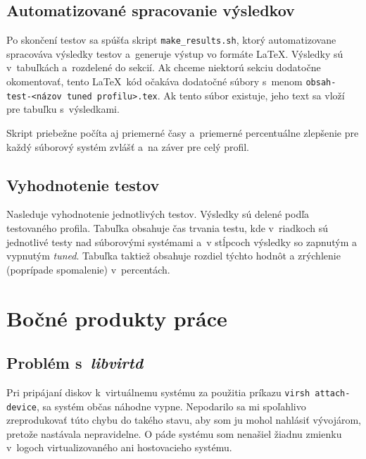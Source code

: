 \section{Automatizované spracovanie výsledkov}

Po skončení testov sa spúšťa skript \texttt{make\_results.sh}, ktorý
automatizovane spracováva výsledky testov a~generuje výstup vo formáte \LaTeX.
Výsledky sú v~tabuľkách a~rozdelené do sekcií. Ak chceme niektorú sekciu
dodatočne okomentovať, tento \LaTeX~kód očakáva dodatočné súbory s~menom
\texttt{obsah-test-<názov tuned profilu>.tex}. Ak tento súbor existuje, jeho
text sa vloží pre tabuľku s~výsledkami.

Skript priebežne počíta aj priemerné časy a~priemerné percentuálne zlepšenie
pre každý súborový systém zvlášť a~na záver pre celý profil. 

%
%

\section{Vyhodnotenie testov}

Nasleduje vyhodnotenie jednotlivých testov. Výsledky sú delené podľa
testovaného profila. Tabuľka obsahuje čas trvania testu, kde v~riadkoch sú
jednotlivé testy nad súborovými systémami a~v stĺpcoch výsledky so zapnutým a
vypnutým \emph{tuned}. Tabuľka taktiež obsahuje rozdiel týchto hodnôt a
zrýchlenie (poprípade spomalenie) v~percentách.


%
%

\chapter{Bočné produkty práce}

%
%

\section{Problém s~\emph{libvirtd}}
\label{sec:libvirt-problem}

Pri pripájaní diskov k~virtuálnemu systému za použitia príkazu \texttt{virsh
attach-device}, sa systém občas náhodne vypne. Nepodarilo sa mi spoľahlivo
zreprodukovať túto chybu do takého stavu, aby som ju mohol nahlásiť vývojárom,
pretože nastávala nepravidelne. O páde systému som nenašiel žiadnu zmienku v~logoch virtualizovaného ani
hostovacieho systému. 

